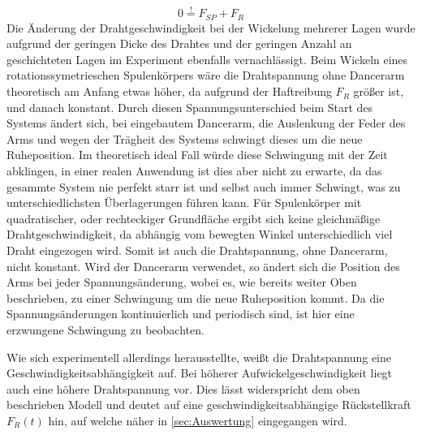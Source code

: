 \begin{equation}
    0 \overset{!}{=}  F_{SP} + F_R
\end{equation}
Die Änderung der Drahtgeschwindigkeit bei der Wickelung mehrerer Lagen wurde aufgrund der geringen Dicke des Drahtes und der geringen Anzahl an geschichteten Lagen im Experiment ebenfalls vernachlässigt.
Beim Wickeln eines rotationssymetrieschen Spulenkörpers wäre die Drahtspannung ohne Dancerarm theoretisch am Anfang etwas höher, da aufgrund der Haftreibung $F_R$ größer ist, und danach konstant. Durch diesen Spannungsunterschied beim Start des Systems ändert sich, bei eingebautem Dancerarm, die Auslenkung der Feder des Arms und wegen der Trägheit des Systems schwingt dieses um die neue Ruheposition. Im theoretisch ideal Fall würde diese Schwingung mit der Zeit abklingen, in einer realen Anwendung ist dies aber nicht zu erwarte, da das gesammte System nie perfekt starr ist und selbst auch immer Schwingt, was zu unterschiedlichsten Überlagerungen führen kann.\newline
Für Spulenkörper mit quadratischer, oder rechteckiger Grundfläche ergibt sich keine gleichmäßige Drahtgeschwindigkeit, da abhängig vom bewegten Winkel unterschiedlich viel Draht eingezogen wird. Somit ist auch die Drahtspannung, ohne Dancerarm, nicht konstant. Wird der Dancerarm verwendet, so ändert sich die Position des Arms bei jeder Spannungsänderung, wobei es, wie bereits weiter Oben beschrieben, zu einer Schwingung um die neue Ruheposition kommt. Da die Spannungsänderungen kontinuierlich und periodisch sind, ist hier eine erzwungene Schwingung zu beobachten.\newline

Wie sich experimentell allerdings herausstellte, weißt die Drahtspannung eine Geschwindigkeitsabhängigkeit auf. Bei höherer Aufwickelgeschwindigkeit liegt auch eine höhere Drahtspannung vor. Dies lässt widerspricht dem oben beschrieben Modell und deutet auf eine geschwindigkeitsabhängige Rückstellkraft $F_{R}(t)$ hin, auf welche näher in \autoref{sec:Auswertung} eingegangen wird.










